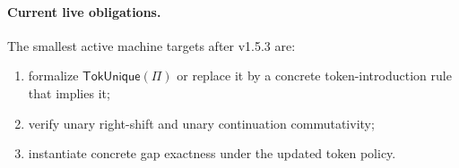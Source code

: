 \paragraph{Current live obligations.}
The smallest active machine targets after v1.5.3 are:
\begin{enumerate}
  \item formalize \(\mathsf{TokUnique}(\Pi)\) or replace it by a concrete token-introduction rule that implies it;
  \item verify unary right-shift and unary continuation commutativity;
  \item instantiate concrete gap exactness under the updated token policy.
\end{enumerate}
